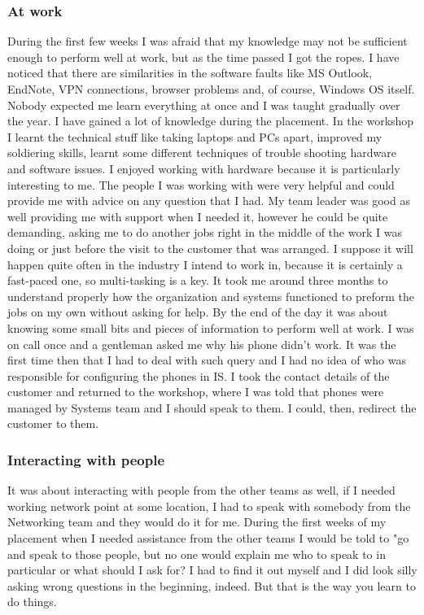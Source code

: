 \documentclass[10pt,a4paper,headinclude=true,twoside]{report}
\begin{document}
\subsubsection{At work}
During the first few weeks I was afraid that my knowledge may not be sufficient enough to perform well at work, but as the time passed I got the ropes. I have noticed that there are similarities in the software faults like MS Outlook, EndNote, VPN connections, browser problems and, of course, Windows OS itself. Nobody expected me learn everything at once and I was taught gradually over the year. I have gained a lot of knowledge during the placement. In the workshop I learnt the technical stuff like taking laptops and PCs apart, improved my soldiering skills, learnt some different techniques of trouble shooting hardware and software issues. I enjoyed working with hardware because it is particularly interesting to me. The people I was working with were very helpful and could provide me with advice on any question that I had. My team leader was good as well providing me with support when I needed it, however he could be quite demanding, asking me to do another jobs right in the middle of the work I was doing or just before the visit to the customer that was arranged. I suppose it will happen quite often in the industry I intend to work in, because it is certainly a fast-paced one, so multi-tasking is a key. It took me around three months to understand properly how the organization and systems functioned to preform the jobs on my own without asking for help. By the end of the day it was about knowing some small bits and pieces of information to perform well at work. I was on call once and a gentleman asked me why his phone didn't work. It was the first time then that I had to deal with such query and I had no idea of who was responsible for configuring the phones in IS. I took the contact details of the customer and returned to the workshop, where I was told that phones were managed by Systems team and I should speak to them. I could, then, redirect the customer to them.

\subsubsection{Interacting with people}
It was about interacting with people from the other teams as well, if I needed working network point at some location, I had to speak with somebody from the Networking team and they would do it for me. During the first weeks of my placement when I needed assistance from the other teams I would be told to "go and speak to those people, but no one would explain me who to speak to in particular or what should I ask for? I had to find it out myself and I did look silly asking wrong questions in the beginning, indeed. But that is the way you learn to do things.
\end{document}
